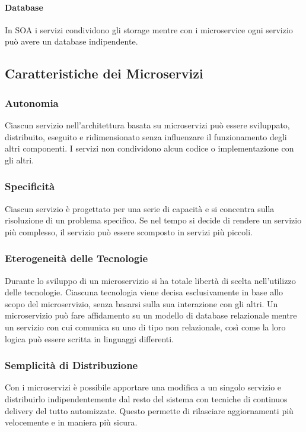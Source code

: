\paragraph{Database} In SOA i servizi condividono gli storage mentre con i microservice ogni servizio può avere un database indipendente.

\subsection{Caratteristiche dei Microservizi}

\subsubsection{Autonomia}
Ciascun servizio nell’architettura basata su microservizi può essere sviluppato, distribuito, eseguito e ridimensionato senza influenzare il funzionamento degli altri componenti. I servizi non condividono alcun codice o implementazione con gli altri.

\subsubsection{Specificità}
Ciascun servizio è progettato per una serie di capacità e si concentra sulla risoluzione di un problema specifico. Se nel tempo si decide di rendere un servizio più complesso, il servizio può essere scomposto in servizi più piccoli.

\subsubsection{Eterogeneità delle Tecnologie}
Durante lo sviluppo di un microservizio si ha totale libertà di scelta nell'utilizzo delle tecnologie. Ciascuna tecnologia viene decisa esclusivamente in base allo scopo del microservizio, senza basarsi sulla sua interazione con gli altri. Un microservizio può fare affidamento su un modello di database relazionale mentre un servizio con cui comunica su uno di tipo non relazionale, così come la loro logica può essere scritta in linguaggi differenti.

\subsubsection{Semplicità di Distribuzione}
Con i microservizi è possibile apportare una modifica a un singolo servizio e distribuirlo indipendentemente dal resto del sistema con tecniche di continuos delivery del tutto automizzate. Questo permette di rilasciare aggiornamenti più velocemente e in maniera più sicura.

